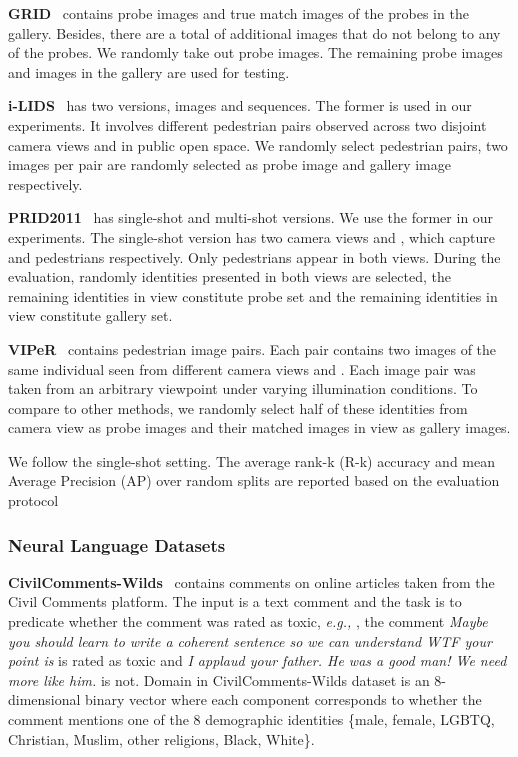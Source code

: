 \documentclass{article} \usepackage{iclr2023_conference,times}
\newcommand{\eg}[0]{\textit{e.g., }}
\begin{document}
\textbf{GRID}~\citep{grid} contains  probe images and  true match images of the probes in the gallery. Besides, there are a total of  additional images that do not belong to any of the probes. We randomly take out  probe images. The remaining  probe images and  images in the gallery are used for testing.

\textbf{i-LIDS}~\citep{ilids} has two versions, images and sequences. The former is used in our experiments. It involves  different pedestrian pairs observed across two disjoint camera views  and  in public open space. We randomly select  pedestrian pairs, two images per pair are randomly selected as probe image and gallery image respectively.

\textbf{PRID2011}~\citep{prid} has single-shot and multi-shot versions. We use the former in our experiments. The single-shot version has two camera views  and , which capture  and  pedestrians respectively. Only  pedestrians appear in both views.  During the evaluation,  randomly identities presented in both views are selected, the remaining  identities in view  constitute probe set and the remaining  identities in view  constitute gallery set.

\textbf{VIPeR}~\citep{viper} contains  pedestrian image pairs. Each pair contains two images of the same individual seen from different camera views  and .  Each image pair was taken from an arbitrary viewpoint under varying illumination conditions. To compare to other methods, we randomly select half of these identities from camera view  as probe images and their matched images in view  as gallery images.

We follow the single-shot setting. The average rank-k (R-k) accuracy and mean Average Precision (AP) over  random splits are reported based on the evaluation protocol

\subsubsection{Neural Language Datasets}
 
\textbf{CivilComments-Wilds}~\citep{koh2021wilds} contains  comments on online articles taken from the Civil Comments platform. The input is a text comment and the task is to predicate whether the comment was rated as toxic, \eg, the comment \textit{Maybe you should learn to write a coherent sentence so we can understand WTF your point is} is rated as toxic and \textit{I applaud your father. He was a good man! We need more like him.} is not. Domain in CivilComments-Wilds dataset is an 8-dimensional binary vector where each component corresponds to whether the comment mentions one of the 8 demographic identities \{male, female, LGBTQ, Christian, Muslim, other religions, Black, White\}. 
 
\end{document}
